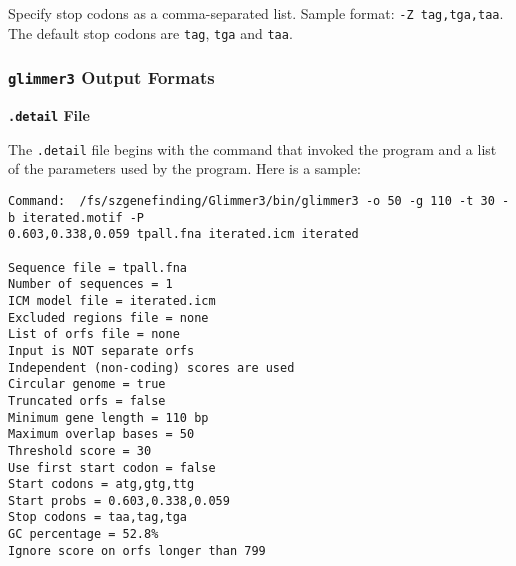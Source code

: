 \documentclass[fleqn,titlepage,11pt]{article}
\def\Pg#1{\texttt{#1}}
\begin{document}
  Specify stop codons as a comma-separated list.
  Sample format:  \verb`-Z tag,tga,taa`.
  The default stop codons are \Pg{tag}, \Pg{tga} and \Pg{taa}.
\el


\subsubsection{\Pg{glimmer3} Output Formats}

\smallskip
\noindent\textbf{\Pg{.detail} File}
\smallskip

The \Pg{.detail} file begins with the command that invoked the program and
a list of the parameters
used by the program.  Here is a sample:
\BSV\begin{verbatim}
Command:  /fs/szgenefinding/Glimmer3/bin/glimmer3 -o 50 -g 110 -t 30 -b iterated.motif -P 
0.603,0.338,0.059 tpall.fna iterated.icm iterated

Sequence file = tpall.fna
Number of sequences = 1
ICM model file = iterated.icm
Excluded regions file = none
List of orfs file = none
Input is NOT separate orfs
Independent (non-coding) scores are used
Circular genome = true
Truncated orfs = false
Minimum gene length = 110 bp
Maximum overlap bases = 50
Threshold score = 30
Use first start codon = false
Start codons = atg,gtg,ttg
Start probs = 0.603,0.338,0.059
Stop codons = taa,tag,tga
GC percentage = 52.8%
Ignore score on orfs longer than 799
\end{verbatim}\ESV
\end{document}
